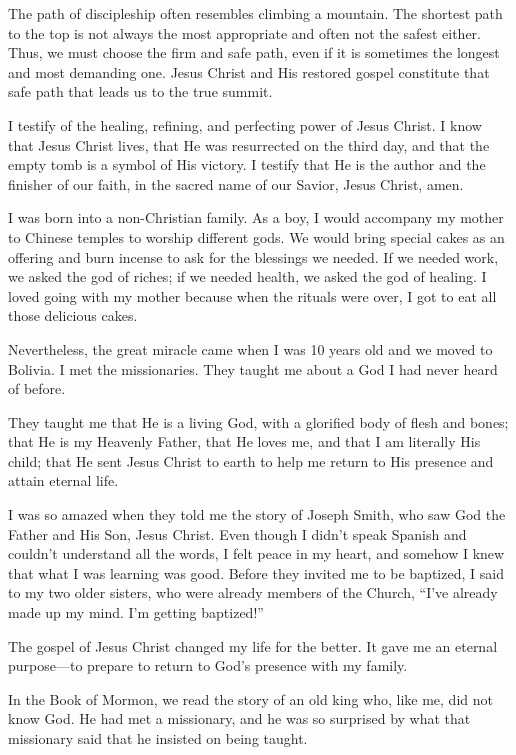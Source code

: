 \documentclass[letterpaper, 11pt]{report}
\newcommand{\speaker}{}
\newcommand{\talk}{}
\newcommand{\talkdatestr}{}
\newcommand{\setspeaker}[1]{\renewcommand{\speaker}{#1}}
\newcommand{\settalk}[1]{\renewcommand{\talk}{#1}}
\newcommand{\talkheading}[2]{%
    \vspace{1em}
    \noindent{\huge\bfseries #1}
    \par\nopagebreak\vspace{0.25em}
    \noindent{\normalsize\bfseries #2\ifx\talkdatestr\empty\else,\ \talkdatestr\fi}
    \par\nopagebreak\vspace{0.5em}
}
\begin{document}
The path of discipleship often resembles climbing a mountain. The shortest path to the top is not always the most appropriate and often not the safest either. Thus, we must choose the firm and safe path, even if it is sometimes the longest and most demanding one. Jesus Christ and His restored gospel constitute that safe path that leads us to the true summit.

I testify of the healing, refining, and perfecting power of Jesus Christ. I know that Jesus Christ lives, that He was resurrected on the third day, and that the empty tomb is a symbol of His victory. I testify that He is the author and the finisher of our faith, in the sacred name of our Savior, Jesus Christ, amen.

\newpage
\settalk{“I Will Give Away All My Sins to Know Thee”}
\setspeaker{Wan-Liang Wu}
\talkheading{“I Will Give Away All My Sins to Know Thee”}{Wan-Liang Wu}

I was born into a non-Christian family. As a boy, I would accompany my mother to Chinese temples to worship different gods. We would bring special cakes as an offering and burn incense to ask for the blessings we needed. If we needed work, we asked the god of riches; if we needed health, we asked the god of healing. I loved going with my mother because when the rituals were over, I got to eat all those delicious cakes.

Nevertheless, the great miracle came when I was 10 years old and we moved to Bolivia. I met the missionaries. They taught me about a God I had never heard of before.

They taught me that He is a living God, with a glorified body of flesh and bones; that He is my Heavenly Father, that He loves me, and that I am literally His child; that He sent Jesus Christ to earth to help me return to His presence and attain eternal life.

I was so amazed when they told me the story of Joseph Smith, who saw God the Father and His Son, Jesus Christ. Even though I didn’t speak Spanish and couldn’t understand all the words, I felt peace in my heart, and somehow I knew that what I was learning was good. Before they invited me to be baptized, I said to my two older sisters, who were already members of the Church, “I’ve already made up my mind. I’m getting baptized!”

The gospel of Jesus Christ changed my life for the better. It gave me an eternal purpose—to prepare to return to God’s presence with my family.

In the Book of Mormon, we read the story of an old king who, like me, did not know God. He had met a missionary, and he was so surprised by what that missionary said that he insisted on being taught.
\end{document}
